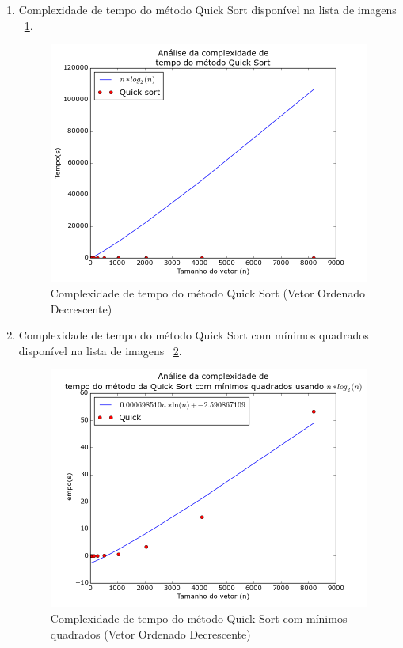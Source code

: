 \documentclass[12pt,a4paper,twoside]{report}
\begin{document}
\begin{enumerate}
\begin{enumerate}
					\item Complexidade de tempo do método Quick Sort disponível na lista de imagens ~\ref{fig:QuickPlot2OD}.
					\begin{figure}[!h]
						\centering
						\includegraphics[scale=0.6]{../imagens/Quick/Quick_plot_2_ordenado_decrescente.png}
						\caption{Complexidade de tempo do método Quick Sort (Vetor Ordenado Decrescente) \label{fig:QuickPlot2OD}}
					\end{figure}


					\item Complexidade de tempo do método Quick Sort com mínimos quadrados disponível na lista de imagens  ~\ref{fig:QuickPlot3OD}.
					\begin{figure}[!h]
						\centering
						\includegraphics[scale=0.6]{../imagens/Quick/Quick_plot_3_ordenado_decrescente.png}
						\caption{Complexidade de tempo do método Quick Sort com mínimos quadrados (Vetor Ordenado Decrescente) \label{fig:QuickPlot3OD}}
					\end{figure}


\end{enumerate}
\end{enumerate}
\end{document}
